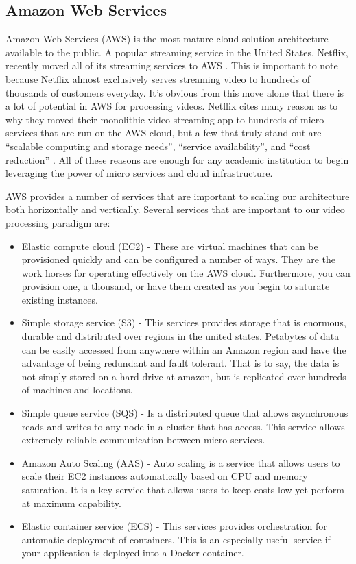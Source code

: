 \subsection{\label{subsection:aws}Amazon Web Services}
Amazon Web Services (AWS) is the most mature cloud solution architecture
available to the public. A popular streaming service in the United States,
Netflix, recently moved all of its streaming services to AWS
\cite{netflixawsmove}. This is important to note because Netflix almost
exclusively serves streaming video to hundreds of thousands of customers
everyday. It's obvious from this move alone that there is a lot of potential in
AWS for processing videos. Netflix cites many reason as to why they moved their
monolithic video streaming app to hundreds of micro services that are run on the
AWS cloud, but a few that truly stand out are \enquote{scalable computing and
storage needs}, \enquote{service availability}, and \enquote{cost reduction}
\cite{netflixawsmove}. All of these reasons are enough for any academic
institution to begin leveraging the power of micro services and cloud
infrastructure.

AWS provides a number of services that are important to scaling our architecture
both horizontally and vertically. Several services that are important to
our video processing paradigm are:
\begin{itemize}
\item Elastic compute cloud (EC2) - These are virtual machines that can be
provisioned quickly and can be configured a number of ways. They are the work
horses for operating effectively on the AWS cloud. Furthermore, you can
provision one, a thousand, or have them created as you begin to saturate
existing instances.
\item Simple storage service (S3) - This services provides storage that is enormous,
durable and distributed over regions in the united states. Petabytes of data can
be easily accessed from anywhere within an Amazon region and have the advantage
of being redundant and fault tolerant. That is to say, the data is not simply
stored on a hard drive at amazon, but is replicated over hundreds of machines
and locations.
\item Simple queue service (SQS) - Is a distributed queue that allows asynchronous
reads and writes to any node in a cluster that has access. This service allows
extremely reliable communication between micro services.
\item Amazon Auto Scaling (AAS) - Auto scaling is a service that allows users
to scale their EC2 instances automatically based on CPU and memory saturation. It
is a key service that allows users to keep costs low yet perform at maximum
capability.
\item Elastic container service (ECS) - This services provides orchestration for
automatic deployment of containers. This is an especially useful service if
your application is deployed into a Docker container.
\end{itemize}

